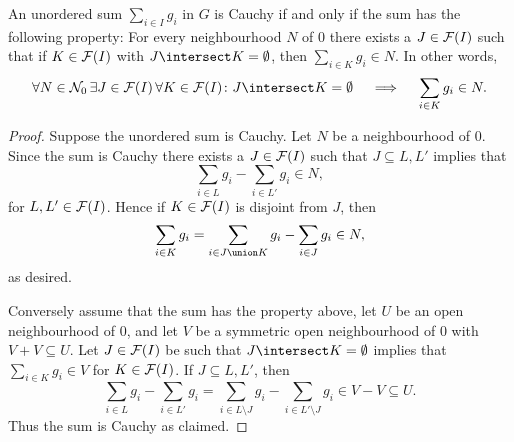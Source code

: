 \documentclass[article, a4paper, 11pt, oneside]{memoir}
\numberwithin{equation}{chapter}
\newcommand{\calL}{\mathcal{L}}
\begin{document}
\newcommand{\calN}{\mathcal{N}}
\newcommand{\nhoods}[1]{\calN_{#1}}
\newcommand{\pnhoods}[1]{\calN'_{#1}}
\newcommand{\limitval}{\calL}

\begin{lemma}
    An unordered sum $\sum_{i \in I} g_i$ in $G$ is Cauchy if and only if the sum has the following property: For every neighbourhood $N$ of $0$ there exists a $J \in \mathcal{F}(I)$ such that if $K \in \mathcal{F}(I)$ with $J \intersect K = \emptyset$, then $\sum_{i \in K} g_i \in N$. In other words,
    \begin{equation*}
        \forall N \in \nhoods{0} \,
            \exists J \in \finsubsets{I} \,
            \forall K \in \finsubsets{I}\colon
            J \intersect K = \emptyset
            \quad \implies \quad
            \sum_{i \in K} g_i \in N.
    \end{equation*}
\end{lemma}

\begin{proof}
    Suppose the unordered sum is Cauchy. Let $N$ be a neighbourhood of $0$. Since the sum is Cauchy there exists a $J \in \mathcal{F}(I)$ such that $J \subseteq L,L'$ implies that
    \begin{equation*}
        \sum_{i \in L} g_i - \sum_{i \in L'} g_i
            \in N,
    \end{equation*}
    for $L,L' \in \mathcal{F}(I)$. Hence if $K \in \mathcal{F}(I)$ is disjoint from $J$, then
    \begin{equation*}
        \sum_{i \in K} g_i
            = \sum_{i \in J \union K} g_i - \sum_{i \in J} g_i
            \in N,
    \end{equation*}
    as desired.

    Conversely assume that the sum has the property above, let $U$ be an open neighbourhood of $0$, and let $V$ be a symmetric open neighbourhood of $0$ with $V + V \subseteq U$. Let $J \in \mathcal{F}(I)$ be such that $J \intersect K = \emptyset$ implies that $\sum_{i \in K} g_i \in V$ for $K \in \mathcal{F}(I)$. If $J \subseteq L,L'$, then
    \begin{equation*}
        \sum_{i \in L} g_i - \sum_{i \in L'} g_i
            = \sum_{i \in L \setminus J} g_i - \sum_{i \in L' \setminus J} g_i
            \in V - V
            \subseteq U.
    \end{equation*}
    Thus the sum is Cauchy as claimed. %
\end{proof}
\end{document}
